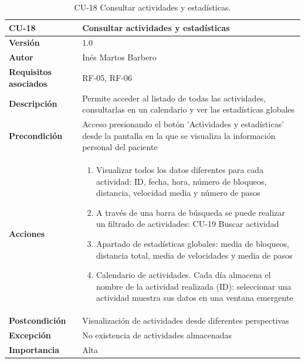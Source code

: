 \begin{table}[p]
	\centering
	\begin{tabularx}{\linewidth}{ p{} p{} }
		\toprule
		\textbf{CU-18}    & \textbf{Consultar actividades y estadísticas}\\
		\toprule
		\textbf{Versión}              & 1.0    \\
		\textbf{Autor}                & Inés Martos Barbero \\
		\textbf{Requisitos asociados} & RF-05, RF-06 \\
		\textbf{Descripción}          & Permite acceder al listado de todas las actividades, consultarlas en un calendario y ver las estadísticas globales \\
		\textbf{Precondición}         & Acceso presionando el botón 'Actividades y estadísticas' desde la pantalla en la que se visualiza la información personal del paciente \\
		\textbf{Acciones}             &
		\begin{enumerate}
			\def\labelenumi{\arabic{enumi}.}
			\tightlist
			\item Visualizar todos los datos diferentes para cada actividad: ID, fecha, hora, número de bloqueos, distancia, velocidad media y número de pasos
            \item A través de una barra de búsqueda se puede realizar un filtrado de actividades: CU-19 Buscar actividad
            \item Apartado de estadísticas globales: media de bloqueos, distancia total, media de velocidades y media de pasos
			\item Calendario de actividades. Cada día almacena el nombre de la actividad realizada (ID): seleccionar una actividad muestra sus datos en una ventana emergente
		\end{enumerate}\\
		\textbf{Postcondición}        &  Visualización de actividades desde diferentes perspectivas\\
		\textbf{Excepción}          & No existencia de actividades almacenadas \\
		\textbf{Importancia}          & Alta  \\
		\bottomrule
	\end{tabularx}
	\caption{CU-18 Consultar actividades y estadísticas.}
\end{table}

